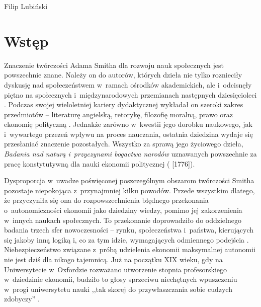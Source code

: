 \begin{artplenv}{Filip Lubiński}
\section*{Wstęp}
\lettrine[loversize=0.13,lines=2,lraise=-0.05,nindent=0em,findent=0.2pt]%
{Z}{}naczenie twórczości Adama Smitha dla rozwoju nauk społecznych jest powszechnie znane. Należy on do autorów, których
dzieła nie tylko roznieciły dyskusję nad społeczeństwem w~ramach ośrodków akademickich, ale i~odcisnęły piętno na
społecznych i~międzynarodowych przemianach następnych dziesięcioleci
\parencite[s.~12]{milgate_after_2009}.
Podczas swojej wieloletniej kariery dydaktycznej wykładał on szeroki zakres przedmiotów -- literaturę angielską,
retorykę, filozofię moralną, prawo oraz ekonomię polityczną
\parencite[s.~126]{roncaglia_wealth_2005}.
Jednakże zarówno w~kwestii jego dorobku naukowego, jak i~wywartego przezeń wpływu na proces nauczania, ostatnia
dziedzina wydaje się przesłaniać znaczenie pozostałych. Wszystko za sprawą jego życiowego dzieła, \textit{Badania nad
naturą i~przyczynami bogactwa narodów }uznawanych powszechnie za pracę konstytutywną dla nauki ekonomii politycznej
(\cite{smith_badania_2007} [1776]).

Dysproporcja w~uwadze poświęconej poszczególnym obszarom twórczości Smitha pozostaje niepokojąca z~przynajmniej
kilku powodów. Przede wszystkim dlatego, że przyczyniła się ona do rozpowszechnienia błędnego
przekonania o~autonomiczności ekonomii jako dziedziny wiedzy, pomimo jej zakorzenienia w~innych naukach społecznych.
To przekonanie
doprowadziło do oddzielnego badania trzech sfer nowoczesności -- rynku, społeczeństwa i~państwa, kierujących się jakoby
inną logiką i, co za tym idzie, wymagających odmiennego podejścia
\parencite[s.~19]{wallerstein_analiza_2007}.
Niebezpieczeństwo związane z~próbą udzielenia ekonomii maksymalnej autonomii nie jest dziś dla nikogo tajemnicą. Już na
początku XIX wieku, gdy na Uniwersytecie w~Oxfordzie rozważano utworzenie stopnia profesorskiego w~dziedzinie ekonomii,
budziło to głosy sprzeciwu niechętnych wpuszczeniu w~progi uniwersytetu nauki ,,tak skorej do przywłaszczania sobie
cudzych zdobyczy''
\parencite[s.~54]{schumacher_male_1981}.


\end{artplenv}

